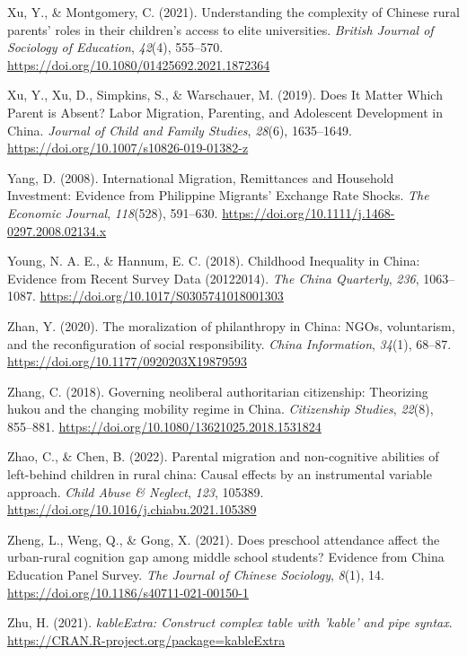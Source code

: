 \documentclass[
  man]{apa7}
\newlength{\cslhangindent}
\newlength{\cslentryspacingunit} %
\newenvironment{CSLReferences}[2] %
 {%
  \setlength{\parindent}{0pt}
  \ifodd #1
  \let\oldpar\par
  \def\par{\hangindent=\cslhangindent\oldpar}
  \fi
  \setlength{\parskip}{#2\cslentryspacingunit}
 }%
 {}
\begin{document}
\begin{CSLReferences}{1}{0}
\leavevmode{}%
Xu, Y., \& Montgomery, C. (2021). Understanding the complexity of Chinese rural parents{'} roles in their children{'}s access to elite universities. \emph{British Journal of Sociology of Education}, \emph{42}(4), 555--570. \url{https://doi.org/10.1080/01425692.2021.1872364}

\leavevmode{}%
Xu, Y., Xu, D., Simpkins, S., \& Warschauer, M. (2019). Does It Matter Which Parent is Absent? Labor Migration, Parenting, and Adolescent Development in {China}. \emph{Journal of Child and Family Studies}, \emph{28}(6), 1635--1649. \url{https://doi.org/10.1007/s10826-019-01382-z}

\leavevmode{}%
Yang, D. (2008). International Migration, Remittances and Household Investment: Evidence from Philippine Migrants{'} Exchange Rate Shocks. \emph{The Economic Journal}, \emph{118}(528), 591--630. \url{https://doi.org/10.1111/j.1468-0297.2008.02134.x}

\leavevmode{}%
Young, N. A. E., \& Hannum, E. C. (2018). Childhood Inequality in {China}: Evidence from Recent Survey Data (2012{\textendash}2014). \emph{The {China} Quarterly}, \emph{236}, 1063--1087. \url{https://doi.org/10.1017/S0305741018001303}

\leavevmode{}%
Zhan, Y. (2020). The moralization of philanthropy in {China}: NGOs, voluntarism, and the reconfiguration of social responsibility. \emph{{China} Information}, \emph{34}(1), 68--87. \url{https://doi.org/10.1177/0920203X19879593}

\leavevmode{}%
Zhang, C. (2018). Governing neoliberal authoritarian citizenship: Theorizing hukou and the changing mobility regime in {China}. \emph{Citizenship Studies}, \emph{22}(8), 855--881. \url{https://doi.org/10.1080/13621025.2018.1531824}

\leavevmode{}%
Zhao, C., \& Chen, B. (2022). Parental migration and non-cognitive abilities of left-behind children in rural china: Causal effects by an instrumental variable approach. \emph{Child Abuse \& Neglect}, \emph{123}, 105389. \url{https://doi.org/10.1016/j.chiabu.2021.105389}

\leavevmode{}%
Zheng, L., Weng, Q., \& Gong, X. (2021). Does preschool attendance affect the urban-rural cognition gap among middle school students? Evidence from {China Education Panel Survey}. \emph{The Journal of Chinese Sociology}, \emph{8}(1), 14. \url{https://doi.org/10.1186/s40711-021-00150-1}

\leavevmode{}%
Zhu, H. (2021). \emph{kableExtra: Construct complex table with 'kable' and pipe syntax}. \url{https://CRAN.R-project.org/package=kableExtra}

\end{CSLReferences}

\newpage

\hypertarget{appendix-appendix}{%
\appendix}
\end{document}
